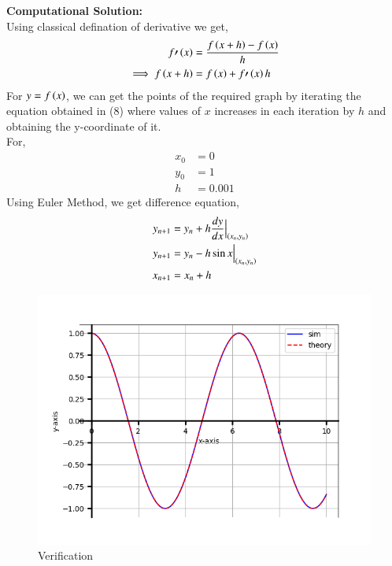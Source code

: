 \documentclass[journal]{IEEEtran}
\begin{document}
\textbf{Computational Solution:}\\
Using classical defination of derivative we get,\\
\begin{align}
    f\prime\left(x\right) &= \frac{f\left(x+h\right)-f\left(x\right)}{h}\\
    \implies f\left(x+h\right) &= f\left(x\right) + f\prime\left(x\right)h
\end{align}
For  $y = f\left(x\right)$, we can get the  points of the required graph by iterating the equation obtained in (8) where values of $x$ increases in each iteration by $h$ and obtaining the y-coordinate of it.\\
For,
\begin{align}
x_0 &= 0\\
y_0 &= 1\\
h &= 0.001
\end{align}
Using Euler Method, we get difference equation,
\begin{align}
y_{n+1} &= y_n + h\frac{dy}{dx}\Big|_{\left(x_n,y_n\right)}\\
y_{n+1} &= y_n - h\sin x \Big|_{\left(x_n,y_n\right)}\\
x_{n+1} &= x_n + h
\end{align}

\begin{figure}[h]  %
    \centering  %
    \includegraphics[width=\columnwidth]{fig/Figure_1.png}  
    \caption{Verification}
    \label{fig:example}  %
\end{figure}
 
\end{document}
